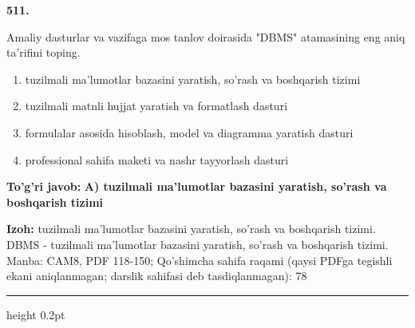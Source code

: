 \documentclass[10pt,a4paper]{article}
\begin{document}
{\bfseries\sffamily\color{ink} 511.}
\par
Amaliy dasturlar va vazifaga mos tanlov doirasida "DBMS" atamasining eng aniq ta'rifini toping.
\begin{enumerate}[label=\Alph*),leftmargin=9mm]
\item tuzilmali ma'lumotlar bazasini yaratish, so'rash va boshqarish tizimi
\item tuzilmali matnli hujjat yaratish va formatlash dasturi
\item formulalar asosida hisoblash, model va diagramma yaratish dasturi
\item professional sahifa maketi va nashr tayyorlash dasturi
\end{enumerate}
\begin{tcolorbox}[enhanced,breakable,colback=teal!4,colframe=teal!60!black,boxrule=0.45pt,arc=1.2mm,left=2.7mm,right=2.7mm,top=1.8mm,bottom=1.8mm,before skip=2mm,after skip=2mm]
{\bfseries\sffamily\color{teal}To'g'ri javob:} \textbf{A) tuzilmali ma'lumotlar bazasini yaratish, so'rash va boshqarish tizimi}
\par\smallskip
{\bfseries Izoh:} tuzilmali ma'lumotlar bazasini yaratish, so'rash va boshqarish tizimi. DBMS - tuzilmali ma'lumotlar bazasini yaratish, so'rash va boshqarish tizimi. Manba: CAM8, PDF 118-150; Qo'shimcha sahifa raqami (qaysi PDFga tegishli ekani aniqlanmagan; darslik sahifasi deb tasdiqlanmagan): 78
\end{tcolorbox}
\vspace{2mm}\hrule height 0.2pt\vspace{3mm}
\end{document}
